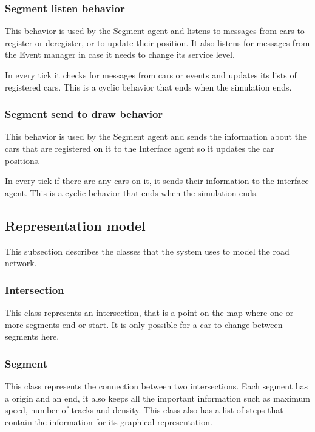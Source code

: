 \subsubsection{Segment listen behavior}

This behavior is used by the Segment agent and listens to messages from cars to register or deregister, or to update their position. It also listens for messages from the Event manager in case it needs to change its service level.

In every tick it checks for messages from cars or events and updates its lists of registered cars. This is a cyclic behavior that ends when the simulation ends.

\subsubsection{Segment send to draw behavior}

This behavior is used by the Segment agent and sends the information about the cars that are registered on it to the Interface agent so it updates the car positions.

In every tick if there are any cars on it, it sends their information to the interface agent. This is a cyclic behavior that ends when the simulation ends.

\subsection{Representation model}

This subsection describes the classes that the system uses to model the road network.

\subsubsection{Intersection}

This class represents an intersection, that is a point on the map where one or more segments end or start. It is only possible for a car to change between segments here.

\subsubsection{Segment}

This class represents the connection between two intersections. Each segment has a origin and an end, it also keeps all the important information such as maximum speed, number of tracks and density. This class also has a list of steps that contain the information for its graphical representation.

